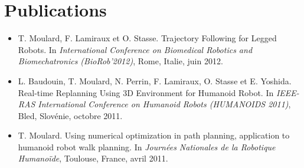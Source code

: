 \chapter*{Publications}\label{chap:publis}

\begin{itemize}
\item T. Moulard, F. Lamiraux et O. Stasse. Trajectory Following for
  Legged Robots. In \emph{International Conference on Biomedical
    Robotics and Biomechatronics (BioRob'2012)}, Rome, Italie, juin
  2012.
\item L. Baudouin, T. Moulard, N. Perrin, F. Lamiraux, O. Stasse et
  E. Yoshida. Real-time Replanning Using 3D Environment for Humanoid
  Robot. In \emph{IEEE-RAS International Conference on Humanoid Robots
    (HUMANOIDS 2011)}, Bled, Slovénie, octobre 2011.
\item T. Moulard. Using numerical optimization in path planning,
  application to humanoid robot walk planning. In \emph{Journées
    Nationales de la Robotique Humanoïde}, Toulouse, France, avril
  2011.
\end{itemize}
